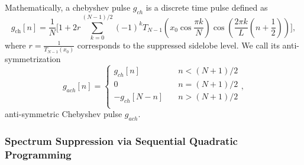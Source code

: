 Mathematically, a chebyshev pulse $g_{ch}$ is a discrete time pulse defined as
$$
  g_{\text{ch}}[n] = \frac{1}{N} \Bigg[ 1 + 2r \sum_{k=0}^{(N-1)/2} (-1)^k T_{N-1}\left(x_0 \cos \frac{\pi k}{N}\right)  \cos \left( \frac{2\pi k}{L} \left(n + \frac{1}{2}\right) \right) \Bigg], $$
where $r = \frac{1}{T_{N-1}(x_0)}$ corresponds to the suppressed sidelobe level.
We call its anti-symmetrization
$$
  g_{ach}[n] = \begin{cases}
    g_{ch}[n]  \quad     & n< (N+1)/2  \\
    0             \quad  & n = (N+1)/2 \\
    -g_{ch}[N-n]   \quad & n > (N+1)/2 \\
  \end{cases},
$$
anti-symmetric Chebyshev pulse $g_{ach}$.
%
%
\subsubsection{Spectrum Suppression via Sequential Quadratic Programming}



